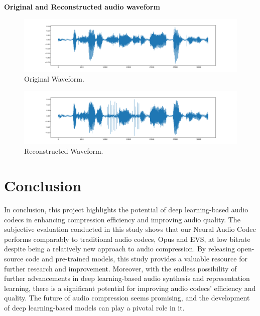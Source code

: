 \documentclass[12pt]{report}
\begin{document}
\newpage
\textbf{Original and Reconstructed audio waveform}\\
\begin{figure}[H]
\includegraphics[width=1\textwidth]{Images/original_audio.pdf}
\caption{Original Waveform.}
\end{figure}

\begin{figure}[H]
\includegraphics[width=1\textwidth]{Images/compressed_audio.pdf}
\caption{Reconstructed Waveform.}
\end{figure}

\chapter{Conclusion}
In conclusion, this project highlights the potential of deep learning-based audio codecs in enhancing compression efficiency and improving audio quality. The subjective evaluation conducted in this study shows that our Neural Audio Codec performs comparably to traditional audio codecs, Opus and EVS, at low bitrate despite being a relatively new approach to audio compression. By releasing open-source code and pre-trained models, this study provides a valuable resource for further research and improvement. Moreover, with the endless possibility of further advancements in deep learning-based audio synthesis and representation learning, there is a significant potential for improving audio codecs' efficiency and quality. The future of audio compression seems promising, and the development of deep learning-based models can play a pivotal role in it.
\renewcommand{\bibname}{References}


\end{document}
